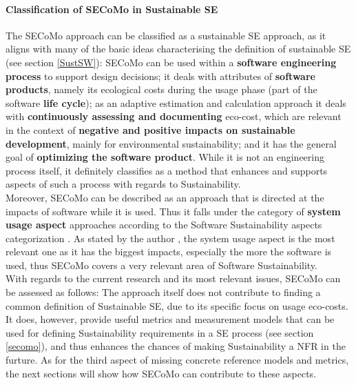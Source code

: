 \documentclass[oribibl]{llncs}
\begin{document}
\paragraph{Classification of SECoMo in Sustainable SE}
The SECoMo approach can be classified as a sustainable SE approach, as it aligns with many of the basic ideas characterising the definition of sustainable SE (see section \ref{SustSW}): SECoMo can be used within a \textbf{software engineering process} to support design decisions; it deals with attributes of \textbf{software products}, namely its ecological costs during the usage phase (part of the software \textbf{life cycle}); as an adaptive estimation and calculation approach it deals with \textbf{continuously assessing and documenting} eco-cost, which are relevant in the context of \textbf{negative and positive impacts on sustainable development}, mainly for environmental sustainability; and it has the general goal of \textbf{optimizing the software product}. While it is not an engineering process itself, it definitely classifies as a method that enhances and supports aspects of such a process with regards to Sustainability.\\
Moreover, SECoMo can be described as an approach that is directed at the impacts of software while it is used. Thus it falls under the category of \textbf{system usage aspect} approaches according to the Software Sustainability aspects categorization \cite{penzenstadler_supporting_2012}. %
As stated by the author \cite{penzenstadler_what_13}, the system usage aspect is the most relevant one as it has the biggest impacts, especially the more the software is used, thus SECoMo covers a very relevant area of Software Sustainability.\\
With regards to the current research and its most relevant issues, SECoMo can be assessed as follows: The approach itself does not contribute to finding a common definition of Sustainable SE, due to its specific focus on usage eco-costs. It does, however, provide useful metrics and measurement models that can be used for defining Sustainability requirements in a SE process (see section \ref{secomo}), and thus enhances the chances of making Sustainability a NFR in the furture. As for the third aspect of missing concrete reference models and metrics, the next sections will show how SECoMo can contribute to these aspects. 
\end{document}
